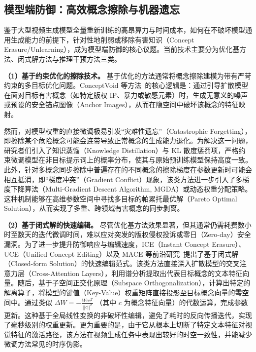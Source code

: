 \subsection{模型端防御：高效概念擦除与机器遗忘}

鉴于大型视频生成模型全量重新训练的高昂算力与时间成本，如何在不破坏模型通用生成能力的前提下，针对性地削弱或移除有害知识（Concept Erasure/Unlearning），成为模型端防御的核心议题。当前技术主要分为优化基方法、闭式解方法与推理干预方法三类。

\textbf{（1）基于约束优化的擦除技术。} 基于优化的方法通常将概念擦除建模为带有严苛约束的多目标优化问题。ConceptVoid 等方法~\cite{huang2025conceptvoid, Wu2024UnlearningCI, Bui2024ErasingUC, Liu2024RealEraSC, Kim2023TowardsSS}的核心逻辑是：通过引导扩散模型在面对目标有害概念（如特定版权 IP、暴力或敏感元素）时，生成无意义的噪声或预设的安全锚点图像（Anchor Images），从而在隐空间中破坏该概念的特征映射。

然而，对模型权重的直接微调极易引发“灾难性遗忘”（Catastrophic Forgetting），即擦除某个危险概念可能会连带导致正常概念的生成能力退化。为解决这一问题，研究者们引入了知识蒸馏（Knowledge Distillation）与 KL 散度惩罚项，严格约束微调模型在非目标提示词上的概率分布，使其与原始预训练模型保持高度一致。此外，针对多概念同步擦除中普遍存在的不同概念的擦除梯度在参数更新时可能会相互抵消，即“梯度冲突”（Gradient Conflict）现象，该类方法进一步引入了多梯度下降算法（Multi-Gradient Descent Algorithm, MGDA）或动态权重分配策略。这种机制能够在高维参数空间中寻找多目标的帕累托最优解（Pareto Optimal Solution），从而实现了多重、跨领域有害概念的同步剥离。

\textbf{（2）基于闭式解的快速编辑。} 尽管优化基方法效果显著，但其通常仍需耗费数小时至数天的迭代微调时间，难以应对突发的版权侵权投诉或零日（Zero-day）安全漏洞。为了进一步提升防御响应与编辑速度，ICE（Instant Concept Erasure）、UCE（Unified Concept Editing）以及 MACE 等前沿研究~\cite{biswas2025now, Gandikota2023UnifiedCE, Lu2024MACEMC, Gong2024ReliableAE}提出了基于闭式解（Closed-form Solution）的快速编辑范式。该类方法直接深入扩散模型的交叉注意力层（Cross-Attention Layers），利用谱分析提取出代表目标概念的文本特征向量。随后，基于子空间正交化原理（Subspace Orthogonalization），计算出特定的解离算子，将模型的键值（Key-Value）权重矩阵直接投影至目标概念向量的零空间中。通过类似 $\Delta W = - \frac{W c c^T}{||c||^2}$ （其中 $c$ 为概念特征向量）的代数运算，完成参数更新。这种基于全局线性变换的非破坏性编辑，避免了耗时的反向传播迭代，实现了毫秒级别的权重更新。更为重要的是，由于它从根本上切断了特定文本特征对视觉特征的激活路径，该方法在视频生成任务中表现出较好的时空一致性，并能减少微调方法常见的时序伪影。

